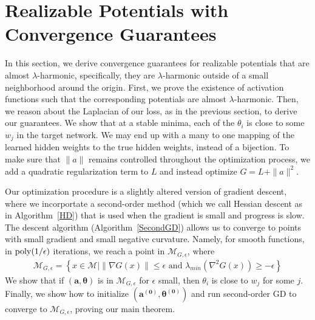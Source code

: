 
\section{Realizable Potentials with Convergence Guarantees}
\label{sec:almost-harmonic}
In this section, we derive convergence guarantees for realizable
potentials that are almost $\lambda$-harmonic, specifically, they are
$\lambda$-harmonic outside of a small neighborhood around the
origin. First, we prove the existence of activation functions such
that the corresponding potentials are almost $\lambda$-harmonic. Then,
we reason about the Laplacian of our loss, as in the previous section,
to derive our guarantees. We show that at a stable minima, each of the
$\theta_i$ is close to some $w_j$ in the target network. We may end up
with a many to one mapping of the learned hidden weights to the true
hidden weights, instead of a bijection.
To make sure that $\|a\|$ remains controlled throughout the
optimization process, we add a quadratic regularization term to $L$
and instead optimize $G = L + \|a\|^2$.



%


Our optimization procedure is a slightly altered version of gradient
descent, where we incorportate a second-order method (which we call
Hessian descent as in Algorithm~\ref{HD}) that is used when the
gradient is small and progress is slow. The descent algorithm
(Algorithm~\ref{SecondGD}) allows us to converge to points with small
gradient and small negative curvature. Namely, for smooth functions,
in $\mathrm{poly}(1/\epsilon)$ iterations, we reach a point in
$\mathcal{M}_{G, \epsilon}$, where
%
%
\begin{align*}
\mathcal{M}_{G, \epsilon} = \left\{x\in \mathcal{M} \Big| \|\nabla G(x)\|
  \leq \epsilon \text{ and } \lambda_{min}(\nabla^2 G(x)) \geq
  -\epsilon\right\}
  \end{align*}
We show that if $(\boldsymbol{a,\theta})$ is in $\mathcal{M}_{G, \epsilon}$ for $\epsilon$ small, then $\theta_i$ is close to $w_j$ for some $j$. Finally, we show how to initialize $(\boldsymbol{a^{(0)},\theta^{(0)}})$ and run second-order GD to converge to $\mathcal{M}_{G,\epsilon}$, proving our main theorem.


